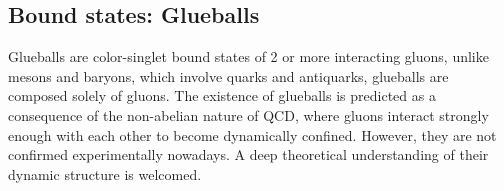 \documentclass[11pt,a4paper,twoside,pdf]{article}
\numberwithin{equation}{section}
\begin{document}

\newpage

\subsection{Bound states: Glueballs}

Glueballs are color-singlet bound states of 2 or more interacting gluons, unlike mesons
and baryons, which involve quarks and antiquarks, glueballs are composed solely of gluons.
The existence of glueballs is predicted as a consequence of the non-abelian nature of QCD, where gluons
interact strongly enough with each other to become dynamically confined. However,
they are not confirmed experimentally nowadays. A deep theoretical understanding of 
their dynamic structure is welcomed.
\end{document}
